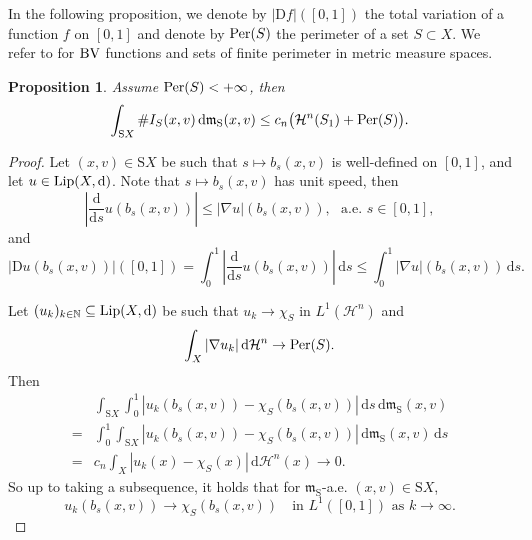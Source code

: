 \documentclass[a4paper,11pt]{article}
\numberwithin{equation}{section}
\theoremstyle{plain}
\newtheorem{proposition}[theorem]{Proposition}
\theoremstyle{definition}
\theoremstyle{remark}
\newcommand{\mm}{\mathfrak m}
\newcommand{\N}{\mathbb{N}}
\newcommand{\rS}{\mathrm{S}}
\newcommand{\Lip}{\mathop{\rm Lip}\nolimits}
\renewcommand{\d}{{\mathrm d}}
\newcommand{\D}{{\mathrm D}}
\begin{document}
	
	In the following proposition,  we denote by $|\D f|([0,1])$ the total variation of a function $f$ on $[0,1]$ and denote by ${\rm{Per}}(S)$ the perimeter of a set $S\subset X$.   We refer to \cite{zbMATH05152934, zbMATH06320681} for $\rm{BV}$ functions and sets of finite perimeter in metric measure spaces.
	
	
	\begin{proposition}\label{prop3.5}
		Assume ${\rm{Per}}(S)<+\infty$, then 
		\begin{equation*}
			\int_{{\rS}X}\# I_S(x,v)\,\d\mm_\rS(x,v)\leq c_n\big(\mathcal{H}^n(S_1)+{\rm{Per}}(S)\big).
		\end{equation*}
	\end{proposition}
	
	\begin{proof}
 Let  $(x,v)\in {\rS}X$ be such that  $s \mapsto b_s(x,v)$ is well-defined on $[0,1]$, and let  $u\in \Lip(X,\d)$. 
		Note that $s \mapsto b_s(x,v)$ has unit speed, then 
		\begin{equation*}
			\left|\frac{\d}{\d s}u(b_s(x,v))\right|\leq \left|\nabla u\right|(b_s(x,v)),~~~\text{a.e. $s\in [0,1]$}, 
		\end{equation*} and
		\begin{equation}\label{3.7}
		|\D u (b_s(x,v))|([0,1])=\int_0^1 	\left|\frac{\d}{\d s}u(b_s(x,v))\right|\,\d s\leq  \int_0^1 |\nabla u|(b_s(x,v))\,\d s.
			\end{equation}
		
Let $(u_k)_{k\in \N}\subseteq \Lip(X,\d)$ be such that $u_k\rightarrow \chi_S$ in $L^1(\mathcal H^n)$ and
\begin{equation}\label{Per(S)}
			 \int_X |\nabla u_k|\,\d \mathcal{H}^n \rightarrow  {\rm {Per}}(S).
			\end{equation}Then
		\begin{equation}
			\begin{aligned}
			 &\int_{{\rS}X} \int_0^1\left|u_k(b_s(x,v))-\chi_S(b_s(x,v))\right|\,\d s \,\d\mm_\rS(x,v)\\
			 =& \int_0^1\int_{{\rS}X}\left|u_k(b_s(x,v))-\chi_S(b_s(x,v))\right|\,\d\mm_\rS(x,v)\,\d s\\
			{=}&c_n \int_X |u_k(x)-\chi_S(x)|\,\d\mathcal{H}^n(x)\rightarrow 0.
			\end{aligned}
		\end{equation}
	So up to taking a subsequence,   it holds that for $\mm_\rS$-a.e. $(x,v)\in {\rS}X$,
	\begin{equation}
		u_k(b_s(x,v))\rightarrow \chi_S(b_s(x,v)) \quad\text{in $L^1([0,1])$ as $k\to \infty$}.
	\end{equation}
			


\end{proof}
\end{document}
